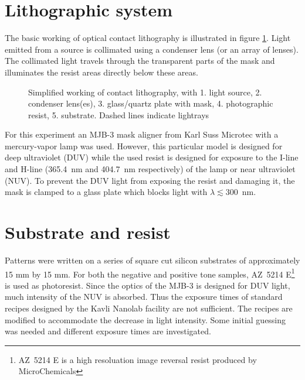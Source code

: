 \section*{Lithographic system}
The basic working of optical contact lithography is illustrated in figure \ref{fig:contact-litho}. Light emitted from a source is collimated using a condenser lens (or an array of lenses). The collimated light travels through the transparent parts of the mask and illuminates the resist areas directly below these areas. 
\begin{figure}[H]
	\centering
	\resizebox{0.7\linewidth}{!}{}
	\caption{Simplified working of contact lithography, with 1. light source, 2. condenser lens(es), 3. glass/quartz plate with mask, 4. photographic resist, 5. substrate. Dashed lines indicate lightrays}
	\label{fig:contact-litho}
\end{figure} For this experiment an MJB-3 mask aligner from Karl Suss Microtec with a mercury-vapor lamp was used. However, this particular model is designed for deep ultraviolet (DUV) while the used resist is designed for exposure to the I-line and H-line (365.4~nm and 404.7~nm respectively) of the lamp or near ultraviolet (NUV). To prevent the DUV light from exposing the resist and damaging it, the mask is clamped to a glass plate which blocks light with $\lambda \lesssim 300$~nm.


\section*{Substrate and resist}
Patterns were written on a series of square cut silicon substrates of approximately 15 mm by 15 mm. For both the negative and positive tone samples, AZ~5214 E\footnote{AZ~5214 E is a high resoluation image reversal resist produced by MicroChemicals} is used as photoresist. Since the optics of the MJB-3 is designed for DUV light, much intensity of the NUV is absorbed. Thus the exposure times of standard recipes designed by the Kavli Nanolab facility are not sufficient. The recipes are modified to accommodate the decrease in light intensity. Some initial guessing was needed and different exposure times are  investigated.

